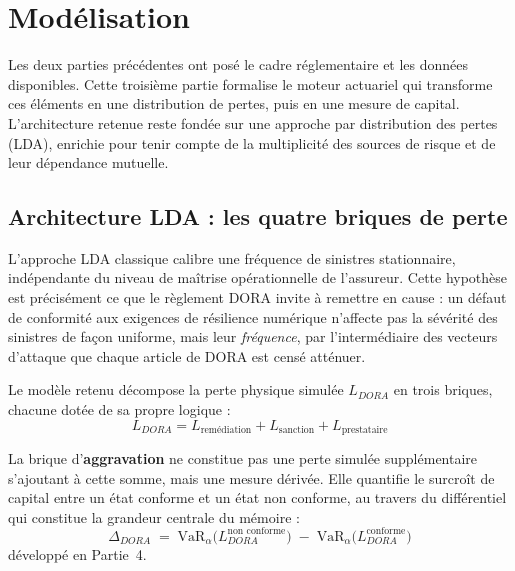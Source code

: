 \documentclass[11pt,a4paper]{article}
\theoremstyle{navystyle}
\theoremstyle{navydef}
\newcommand{\VaR}{\mathrm{VaR}}
\begin{document}
\section{Modélisation}

Les deux parties précédentes ont posé le cadre réglementaire et les données
disponibles. Cette troisième partie formalise le moteur actuariel qui
transforme ces éléments en une distribution de pertes, puis en une mesure de
capital. L'architecture retenue reste fondée sur une approche par
distribution des pertes (LDA), enrichie pour tenir compte de la
multiplicité des sources de risque et de leur dépendance mutuelle.

\subsection{Architecture LDA : les quatre briques de perte}

L'approche LDA classique calibre une fréquence de sinistres stationnaire,
indépendante du niveau de maîtrise opérationnelle de l'assureur. Cette
hypothèse est précisément ce que le règlement DORA invite à remettre en
cause : un défaut de conformité aux exigences de résilience numérique
n'affecte pas la sévérité des sinistres de façon uniforme, mais leur
\emph{fréquence}, par l'intermédiaire des vecteurs d'attaque que chaque
article de DORA est censé atténuer.

Le modèle retenu décompose la perte physique simulée $L_{DORA}$ en trois briques, chacune dotée de sa propre logique :
\begin{equation}
L_{DORA} = L_{\text{remédiation}} + L_{\text{sanction}} + L_{\text{prestataire}}
\end{equation}

La brique d'\textbf{aggravation} ne constitue pas une perte simulée supplémentaire s'ajoutant à cette somme, mais une mesure dérivée. Elle quantifie le surcroît de capital entre un état conforme et un état non conforme, au travers du différentiel qui constitue la grandeur centrale du mémoire :
\begin{equation}
\boxed{\;\Delta_{DORA} \;=\; \VaR_\alpha\!\bigl(L_{DORA}^{\text{non conforme}}\bigr) \;-\; \VaR_\alpha\!\bigl(L_{DORA}^{\text{conforme}}\bigr)\;}
\label{eq:delta-dora}
\end{equation}
développé en Partie~4.
\end{document}
